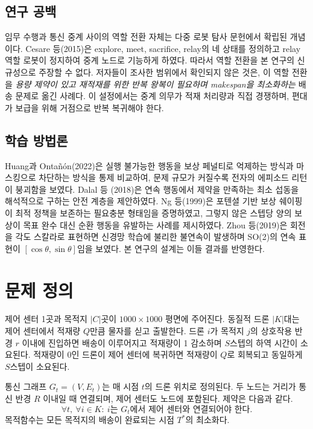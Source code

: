 \documentclass[12pt]{article}
\begin{document}
\subsection{연구 공백}

임무 수행과 통신 중계 사이의 역할 전환 자체는 다중 로봇 탐사 문헌에서 확립된 개념이다.
Cesare 등(2015)은 explore, meet, sacrifice, relay의 네 상태를 정의하고 relay 역할 로봇이 정지하여
중계 노드로 기능하게 하였다. 따라서 역할 전환을 본 연구의 신규성으로 주장할 수 없다.
저자들이 조사한 범위에서 확인되지 않은 것은, 이 역할 전환을 \emph{용량 제약이 있고 재적재를 위한
반복 왕복이 필요하며 makespan을 최소화하는} 배송 문제로 옮긴 사례다. 이 설정에서는 중계 의무가
적재 처리량과 직접 경쟁하며, 편대가 보급을 위해 거점으로 반복 복귀해야 한다.

\subsection{학습 방법론}

Huang과 Ontañón(2022)은 실행 불가능한 행동을 보상 페널티로 억제하는 방식과 마스킹으로 차단하는
방식을 통제 비교하여, 문제 규모가 커질수록 전자의 에피소드 리턴이 붕괴함을 보였다. Dalal 등
(2018)은 연속 행동에서 제약을 만족하는 최소 섭동을 해석적으로 구하는 안전 계층을 제안하였다.
Ng 등(1999)은 포텐셜 기반 보상 쉐이핑이 최적 정책을 보존하는 필요충분 형태임을 증명하였고,
그렇지 않은 스텝당 양의 보상이 목표 완수 대신 순환 행동을 유발하는 사례를 제시하였다.
Zhou 등(2019)은 회전을 각도 스칼라로 표현하면 신경망 학습에 불리한 불연속이 발생하며 SO(2)의
연속 표현이 $[\cos\theta, \sin\theta]$임을 보였다. 본 연구의 설계는 이들 결과를 반영한다.

\section{문제 정의}

제어 센터 1곳과 목적지 $|C|$곳이 $1000 \times 1000$ 평면에 주어진다. 동질적 드론 $|K|$대는
제어 센터에서 적재량 $Q$만큼 물자를 싣고 출발한다. 드론 $i$가 목적지 $j$의 상호작용 반경
$r$ 이내에 진입하면 배송이 이루어지고 적재량이 1 감소하며 $S$스텝의 하역 시간이 소요된다.
적재량이 0인 드론이 제어 센터에 복귀하면 적재량이 $Q$로 회복되고 동일하게 $S$스텝이 소요된다.

통신 그래프 $G_t = (V, E_t)$는 매 시점 $t$의 드론 위치로 정의된다. 두 노드는 거리가 통신 반경
$R$ 이내일 때 연결되며, 제어 센터도 노드에 포함된다. 제약은 다음과 같다.
\begin{equation}
\forall t, \ \forall i \in K: \ i \text{는 } G_t \text{에서 제어 센터와 연결되어야 한다.}
\end{equation}
목적함수는 모든 목적지의 배송이 완료되는 시점 $T^*$의 최소화다.
\end{document}
